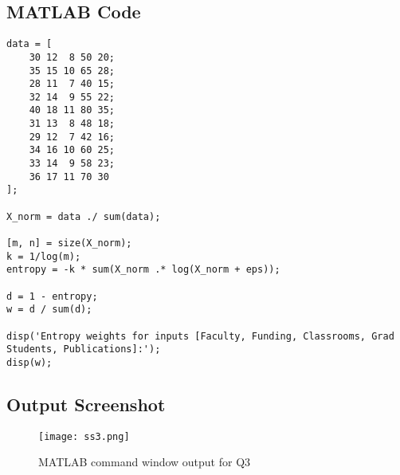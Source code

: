 \documentclass[12pt]{article}
\begin{document}
\subsection*{MATLAB Code}
\begin{lstlisting}
data = [
    30 12  8 50 20;
    35 15 10 65 28;
    28 11  7 40 15;
    32 14  9 55 22;
    40 18 11 80 35;
    31 13  8 48 18;
    29 12  7 42 16;
    34 16 10 60 25;
    33 14  9 58 23;
    36 17 11 70 30
];

X_norm = data ./ sum(data);

[m, n] = size(X_norm);
k = 1/log(m);
entropy = -k * sum(X_norm .* log(X_norm + eps));

d = 1 - entropy;
w = d / sum(d);

disp('Entropy weights for inputs [Faculty, Funding, Classrooms, Grad Students, Publications]:');
disp(w);
\end{lstlisting}

\subsection*{Output Screenshot}
\begin{figure}[h]
  \centering
  \texttt{[image: ss3.png]}
  \caption{MATLAB command window output for Q3}
\end{figure}
\end{document}
